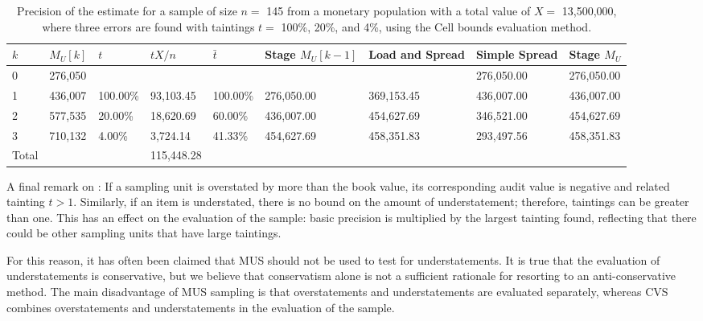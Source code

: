\begin{table}
\begin{tabularx}{\textheight}{X Y Y Y Y Y Y Y Y}
\toprule
\parbox[t]{0.8 cm}{$k$} &
$M_U[k]$ &
$t$ &
$t X / n$ &
$\bar{t}$ &
Stage $M_U[k - 1]$ &
Load and Spread &
Simple Spread &
Stage $M_U$ \\

\midrule

0 & 276,050 & & & & & & 276,050.00 & 276,050.00 \\
1 & 436,007 & 100.00\% & 93,103.45 & 100.00\% & 276,050.00 & 369,153.45 & 436,007.00 & 436,007.00 \\
2 & 577,535 & 20.00\% & 18,620.69 & 60.00\% & 436,007.00 & 454,627.69 & 346,521.00 & 454,627.69 \\
3 & 710,132 & 4.00\% & 3,724.14 & 41.33\% & 454,627.69 & 458,351.83 & 293,497.56 & 458,351.83 \\

\midrule

Total & & & 115,448.28 \\

\bottomrule
\end{tabularx}
\caption{Precision of the estimate for a sample of size $n =$ 145 from a monetary population with a total value of $X =$ 13,500,000, where three errors are found with taintings $t =$ 100\%, 20\%, and 4\%, using the Cell bounds evaluation method.}
\label{tab:precision_Cell}
\end{table}



\bigskip 
A final remark on : 
If a sampling unit is overstated by more than the book value, its corresponding audit value is negative and  related tainting $t > 1$. 
Similarly, if an item is understated, there is no bound on the amount of understatement; therefore, taintings can be greater than one. 
This has an effect on the evaluation of the sample: basic precision is multiplied by the largest tainting found, reflecting that there could be other sampling units that have large taintings.

For this reason, it has often been claimed that MUS should not be used to test for understatements. It is true that the evaluation of understatements is conservative, but we believe that conservatism alone is not a sufficient rationale for resorting to an anti-conservative method. The main disadvantage of MUS sampling is that overstatements and understatements are evaluated separately, whereas CVS combines overstatements and understatements in the evaluation of the sample.

